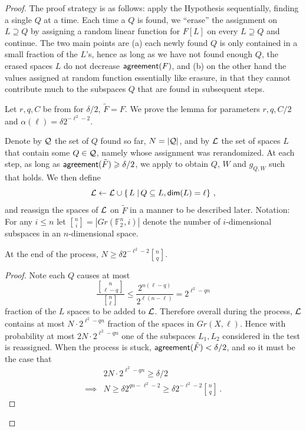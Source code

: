 \documentclass{toc}
\newcommand\card[1]{\left| {#1} \right|}
\newcommand\sett[2]{\left\{ \left. #1 \;\right\vert #2 \right\}}
\renewcommand\geq{\geqslant}
\renewcommand\ge{\geqslant}
\renewcommand\leq{\leqslant}
\renewcommand\le{\leqslant}
\renewcommand\supset{\supseteq}
\def\L{\mathcal{L}}
\def\F{\mathbb{F}}
\def\L{\mathcal{L}}
\def\Q{\mathcal{Q}}
\def\agr{{\sf agreement}}
\begin{document}
\begin{proof}
The proof strategy is as follows: apply the Hypothesis sequentially, finding a single $Q$ at a time. Each time a $Q$
is found, we ``erase'' the assignment on $L\supset Q$ by assigning a random linear function for $F[L]$ on every $L\supset Q$ and continue. The two main points are (a) each newly found $Q$ is only contained
in a small fraction of the $L$'s, hence as long as we have not found enough $Q$, the erased spaces $L$ do not decrease $\agr(F)$,  and (b) on the other hand the values assigned at random function essentially like erasure, in that they cannot contribute much to the
subspaces $Q$
%
that are found in subsequent steps.

Let $r,q,C$ be from  for $\delta/2$,
$\tilde{F} = F$. We prove the lemma for parameters $r,q,C/2$ and
$\alpha(\ell) = \delta 2^{-\ell^2 - 2}$.

\def\L{{\cal L}}
\def\Q{{\cal Q}}
Denote by ${\cal Q}$ the set of $Q$ found so far, $N=\card{{\cal Q}}$,
and by $\L$ the set of spaces $L$ that contain some $Q\in \Q$, namely  whose assignment was rerandomized. At each step, as long as $\agr(\tilde F)\ge \delta/2$, we apply  to obtain $Q$, $W$ and $g_{Q,W}$ such that 
holds. We then define
\[
\L\leftarrow \L\cup\sett{L}{Q\subseteq L,{\sf dim}(L)=\ell}\,,
\]
and reassign the spaces of $\L$ on $\tilde{F}$ in a manner to be described later.
Notation: For any $i\le n$ let ${n \brack i} = \card{Gr(\F_2^n,i)}$ denote the number of $i$-dimensional subspaces in an
$n$-dimensional space.
\begin{claim}
At the end of the process, $N\geq \delta 2^{-\ell^2 - 2}{n \brack q}$.
\end{claim}
\begin{proof}
Note each $Q$ causes at most
\[
\frac{{n \brack \ell - q}}{{n \brack \ell}}\leq \frac{2^{n(\ell-q)}}{2^{\ell(n-\ell)}}
=2^{\ell^2-qn}
\]
fraction of the $L$ spaces to be added to $\L$. Therefore overall during the process, $\L$ contains at most $N\cdot 2^{\ell^2-qn}$ fraction of the spaces in $Gr(X,\ell)$. Hence with probability at most $2N\cdot 2^{\ell^2-qn}$ one of the subspaces $L_1,L_2$ considered in the test is reassigned. When the process is stuck, $\agr(\tilde{F})< \delta/2$, and so it
must be the case that
\begin{align*}
& 2N\cdot 2^{\ell^2-qn} \geq \delta/2 \\
\implies &N\geq \delta 2^{qn-\ell^2 - 2}\geq \delta 2^{-\ell^2 - 2}{n \brack q}\,.
\end{align*}
\end{proof}


\end{proof}
\end{document}
